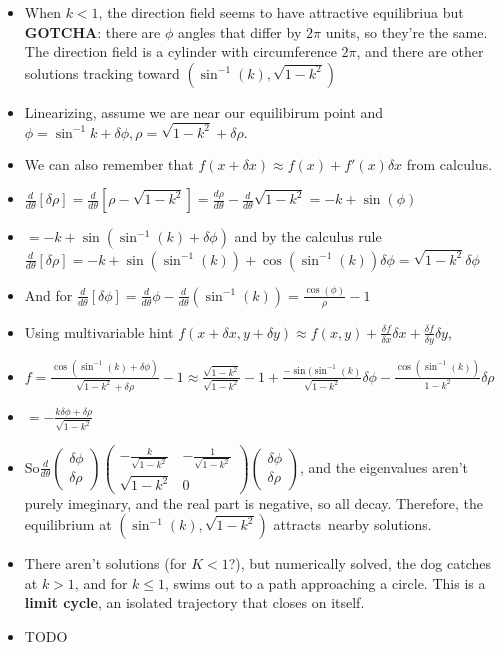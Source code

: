 \documentclass[11pt, oneside]{article}   	%
\begin{document}
\begin{itemize}
\begin{itemize}
\item When $k < 1$, the direction field seems to have attractive equilibriua but \textbf{GOTCHA}: there are $\phi$ angles that differ by $2\pi$ units, so they're the same.  The direction field is a cylinder with circumference $2\pi$, and there are other solutions tracking toward $(\sin^{-1}(k), \sqrt{1-k^2})$
\item Linearizing, assume we are near our equilibirum point and $\phi = \sin^{-1}k + \delta \phi, \rho = \sqrt{1-k^2} + \delta \rho.$
\item We can also remember that $f(x+\delta x) \approx f(x) + f'(x)\delta x$ from calculus.
\item $\frac{d}{d\theta}[\delta \rho] = \frac{d}{d\theta}[\rho - \sqrt{1-k^2}] = \frac{d\rho}{d\theta} - \frac{d}{d\theta}\sqrt{1-k^2} = -k + \sin(\phi)$
\item $= -k + \sin(\sin^{-1}(k) + \delta \phi)$ and by the calculus rule $ \frac{d}{d\theta}[\delta \rho]  = -k + \sin(\sin^{-1}(k)) + \cos(\sin^{-1}(k))\delta \phi = \sqrt{1-k^2}\delta \phi$
\item And for $\frac{d}{d\theta}[\delta \phi] = \frac{d}{d\theta}\phi -  \frac{d}{d\theta} (\sin^{-1}(k)) = \frac{\cos(\phi)}{\rho} - 1$
\item Using multivariable hint $f(x + \delta x, y + \delta y) \approx f(x,y) + \frac{\delta f}{\delta x}\delta x +  \frac{\delta f}{\delta y}\delta y$,
\item $f = \frac{\cos(\sin^{-1}(k) + \delta \phi)}{\sqrt{1-k^2} + \delta \rho} -1  \approx \frac{\sqrt{1-k^2}}{\sqrt{1-k^2}} - 1 + \frac{-\sin(\sin^{-1}(k)}{\sqrt{1-k^2}} \delta \phi - \frac{\cos(\sin^{-1}(k))}{1-k^2} \delta \rho$
\item $=-\frac{k\delta \phi + \delta \rho}{\sqrt{1-k^2}}$
\item So$ \frac{d}{d\theta}\begin{pmatrix} \delta \phi \\ \delta \rho \end{pmatrix} \begin{pmatrix} -\frac{k}{\sqrt{1-k^2}} &-\frac{1}{\sqrt{1-k^2}} \\ \sqrt{1-k^2} & 0  \end{pmatrix} \begin{pmatrix} \delta \phi \\ \delta \rho \end{pmatrix}$, and the eigenvalues aren't purely imeginary, and the real part is negative, so all decay.  Therefore, the equilibrium at $(\sin^{-1}(k), \sqrt{1-k^2})$ attracts\ nearby solutions.
\item There aren't solutions (for $K < 1$?), but numerically solved, the dog catches at $k > 1$, and for $k \leq 1$, swims out to a path approaching a circle.  This is a \textbf{limit cycle}, an isolated trajectory that closes on itself.

\end{itemize}


\end{itemize}


\begin{itemize}
\item TODO
\end{itemize}
\end{document}

